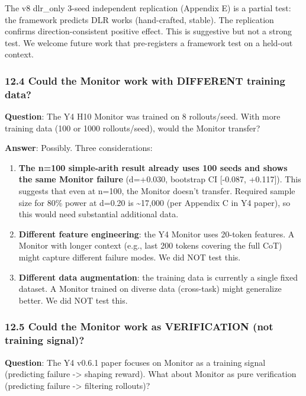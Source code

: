 \documentclass[11pt]{article}
\begin{document}
The v8 dlr\_only 3-seed independent replication (Appendix E) is a
partial test: the framework predicts DLR works (hand-crafted, stable).
The replication confirms direction-consistent positive effect. This is
suggestive but not a strong test. We welcome future work that
pre-registers a framework test on a held-out context.

\subsubsection{12.4 Could the Monitor work with DIFFERENT training
data?}\label{could-the-monitor-work-with-different-training-data}

\textbf{Question}: The Y4 H10 Monitor was trained on 8 rollouts/seed.
With more training data (100 or 1000 rollouts/seed), would the Monitor
transfer?

\textbf{Answer}: Possibly. Three considerations:

\begin{enumerate}
\def\labelenumi{\arabic{enumi}.}
\item
  \textbf{The n=100 simple-arith result already uses 100 seeds and shows
  the same Monitor failure} (d=+0.030, bootstrap CI {[}-0.087,
  +0.117{]}). This suggests that even at n=100, the Monitor doesn't
  transfer. Required sample size for 80\% power at d=0.20 is
  \textasciitilde17,000 (per Appendix C in Y4 paper), so this would need
  substantial additional data.
\item
  \textbf{Different feature engineering}: the Y4 Monitor uses 20-token
  features. A Monitor with longer context (e.g., last 200 tokens
  covering the full CoT) might capture different failure modes. We did
  NOT test this.
\item
  \textbf{Different data augmentation}: the training data is currently a
  single fixed dataset. A Monitor trained on diverse data (cross-task)
  might generalize better. We did NOT test this.
\end{enumerate}

\subsubsection{12.5 Could the Monitor work as VERIFICATION (not training
signal)?}\label{could-the-monitor-work-as-verification-not-training-signal}

\textbf{Question}: The Y4 v0.6.1 paper focuses on Monitor as a training
signal (predicting failure -\textgreater{} shaping reward). What about
Monitor as pure verification (predicting failure -\textgreater{}
filtering rollouts)?
\end{document}
